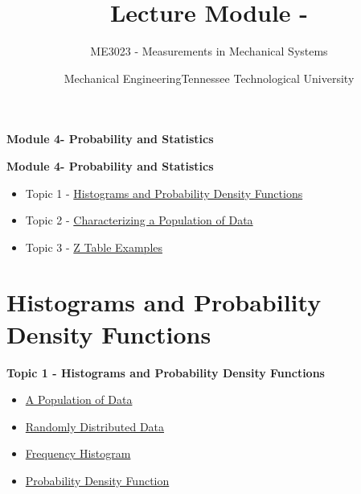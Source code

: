 \documentclass[fleqn]{ltx-talk} %
\author{ME3023 - Measurements in Mechanical Systems}
\title{Lecture Module - \moduletitle}
\date{Mechanical Engineering\vspc Tennessee Technological University}
\newcommand{\MNUM}{4\hspace{2mm}} %
\newcommand{\moduletitle}{Probability and Statistics}
\newcommand{\sectionItitle}{Histograms and Probability Density Functions}
\newcommand{\sectionIItitle}{Characterizing a Population of Data}
\newcommand{\sectionIIItitle}{Z Table Examples}
\newcommand{\sectionIsubsectionItitle}{A Population of Data}
\newcommand{\sectionIsubsectionIItitle}{Randomly Distributed Data}
\newcommand{\sectionIsubsectionIIItitle}{Frequency Histogram}
\newcommand{\sectionIsubsectionIVtitle}{Probability Density Function}
\begin{document}
	\lstset{language=MATLAB,basicstyle=\ttfamily\small,showstringspaces=false}

        \begin{frame}
	    \begin{framed}\Large \textbf{Module \MNUM - \moduletitle}\end{framed}
        \end{frame}

	\begin{frame} 
		\large \textbf{Module \MNUM - \moduletitle} \vspace{3mm}\\

		\begin{itemize}
			\item Topic 1 - \hyperref[sectionI]{\sectionItitle} \vspc %
			\item Topic 2 - \hyperref[sectionII]{\sectionIItitle} \vspc %
			\item Topic 3 - \hyperref[sectionIII]{\sectionIIItitle} \vspc %
		\end{itemize}

	\end{frame}

	\section{\sectionItitle}\label{sectionI}

		\begin{frame} 
			\large \textbf{Topic 1 - \sectionItitle} \vspace{3mm}\\

			\begin{itemize}
				\item \hyperref[sectionIsubsectionI]{\sectionIsubsectionItitle} \vspc %
				\item \hyperref[sectionIsubsectionII]{\sectionIsubsectionIItitle} \vspc %
				\item \hyperref[sectionIsubsectionIII]{\sectionIsubsectionIIItitle} \vspc %
				\item \hyperref[sectionIsubsectionIV]{\sectionIsubsectionIVtitle} \vspc %
			\end{itemize}
		\end{frame}
		
\end{document}
